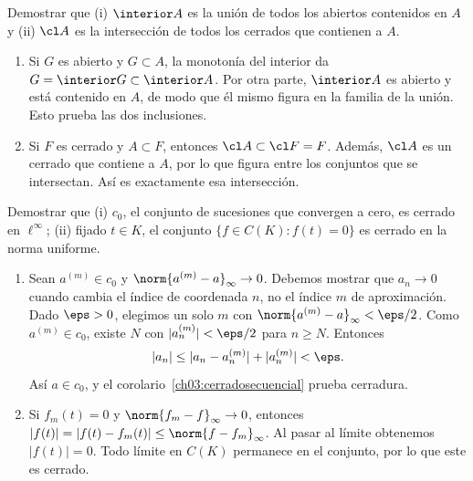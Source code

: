 \begin{ejercicio}\label{ej:lectura-3-1}
Demostrar que (i) $\interior A$ es la unión de todos los abiertos contenidos en $A$ y (ii) $\cl A$ es la intersección de todos los cerrados que contienen a $A$.
\end{ejercicio}
\begin{solucion}
\begin{enumerate}[label=(\roman*)]
\item Si $G$ es abierto y $G\subset A$, la monotonía del interior da $G=\interior G\subset\interior A$. Por otra parte, $\interior A$ es abierto y está contenido en $A$, de modo que él mismo figura en la familia de la unión. Esto prueba las dos inclusiones.
\item Si $F$ es cerrado y $A\subset F$, entonces $\cl A\subset\cl F=F$. Además, $\cl A$ es un cerrado que contiene a $A$, por lo que figura entre los conjuntos que se intersectan. Así es exactamente esa intersección.
\end{enumerate}
\end{solucion}

\begin{ejercicio}\label{ej:lectura-3-2}
Demostrar que (i) $c_0$, el conjunto de sucesiones que convergen a cero, es cerrado en $\ell^\infty$; (ii) fijado $t\in K$, el conjunto $\{f\in C(K):f(t)=0\}$ es cerrado en la norma uniforme.
\end{ejercicio}
\begin{solucion}
\begin{enumerate}[label=(\roman*)]
\item Sean $a^{(m)}\in c_0$ y $\norm{a^{(m)}-a}_\infty\to0$. Debemos mostrar que $a_n\to0$ cuando cambia el índice de coordenada $n$, no el índice $m$ de aproximación. Dado $\eps>0$, elegimos un solo $m$ con $\norm{a^{(m)}-a}_\infty<\eps/2$. Como $a^{(m)}\in c_0$, existe $N$ con $|a^{(m)}_n|<\eps/2$ para $n\ge N$. Entonces
\[
|a_n|\le |a_n-a^{(m)}_n|+|a^{(m)}_n|<\eps.
\]
Así $a\in c_0$, y el corolario~\ref{ch03:cerradosecuencial} prueba cerradura.
\item Si $f_m(t)=0$ y $\norm{f_m-f}_\infty\to0$, entonces $|f(t)|=|f(t)-f_m(t)|\le\norm{f-f_m}_\infty$. Al pasar al límite obtenemos $|f(t)|=0$. Todo límite en $C(K)$ permanece en el conjunto, por lo que este es cerrado.
\end{enumerate}
\end{solucion}

